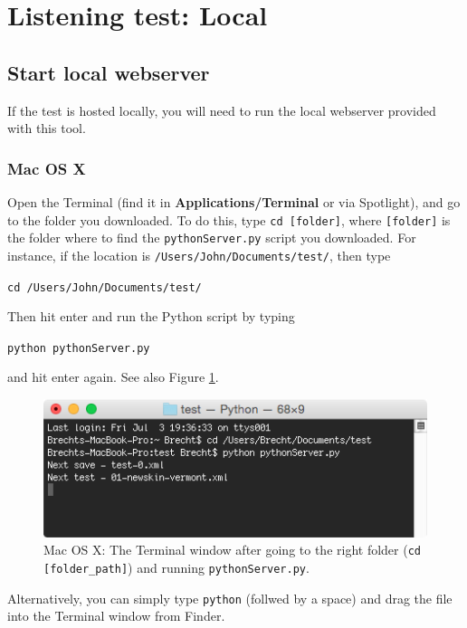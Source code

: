 \documentclass[11pt, oneside]{article}   	%
\begin{document}
\section{Listening test: Local}
	\subsection{Start local webserver}
		If the test is hosted locally, you will need to run the local webserver provided with this tool. 
		
		\subsubsection{Mac OS X}
			Open the Terminal (find it in \textbf{Applications/Terminal} or via Spotlight), and go to the folder you downloaded. To do this, type \texttt{cd [folder]}, where \texttt{[folder]} is the folder where to find the \texttt{pythonServer.py} script you downloaded. For instance, if the location is \texttt{/Users/John/Documents/test/}, then type
			
				\texttt{cd /Users/John/Documents/test/}
				
			Then hit enter and run the Python script by typing

				\texttt{python pythonServer.py}

			and hit enter again. See also Figure \ref{fig:terminal}.
			
			\begin{figure}[htbp]
	                \begin{center}
	                \includegraphics[width=.75\textwidth]{pythonServer.png}
	                \caption{Mac OS X: The Terminal window after going to the right folder (\texttt{cd [folder\_path]}) and running \texttt{pythonServer.py}.}
	                \label{fig:terminal}
	                \end{center}
	                \end{figure}

	        Alternatively, you can simply type \texttt{python} (follwed by a space) and drag the file into the Terminal window from Finder. %
			
\end{document}
